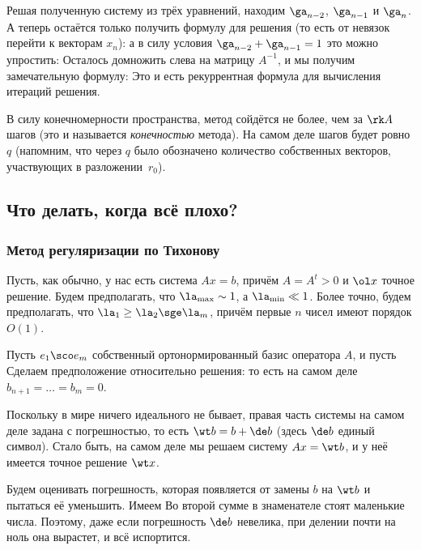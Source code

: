 \documentclass[a4paper]{article}
\begin{document}
Решая полученную систему из трёх уравнений, находим $\ga_{n-2}$,
$\ga_{n-1}$ и $\ga_n$.  А теперь остаётся только получить формулу для
решения (то есть от невязок перейти к векторам $x_n$):  а в силу условия $\ga_{n-2} + \ga_{n-1} = 1$ это
можно упростить:   Осталось домножить слева на
матрицу $A^{-1}$, и мы получим замечательную формулу:   Это
и есть рекуррентная формула для вычисления итераций решения.

В силу конечномерности пространства, метод сойдётся не более, чем за
$\rk A$ шагов (это и называется \emph{конечностью} метода).  На самом
деле шагов будет ровно $q$ (напомним, что через $q$ было обозначено
количество собственных векторов, участвующих в разложении~$r_0$).

\subsection{Что делать, когда всё плохо?}

\subsubsection{Метод регуляризации по Тихонову}

Пусть, как обычно, у нас есть система $Ax = b$, причём $A = A^t > 0$ и
$\ol x$ точное решение.  Будем предполагать, что $\la_{\max} \sim 1$,
а $\la_{\min} \ll 1$. Более точно, будем предполагать, что $\la_1 \ge
\la_2 \sge \la_m$, причём первые $n$ чисел имеют порядок $O(1)$.

Пусть $e_1\sco e_m$ собственный ортонормированный базис оператора $A$,
и пусть   Сделаем предположение
относительно решения:  то есть на самом деле $b_{n+1} = \dots = b_m = 0$.

Поскольку в мире ничего идеального не бывает, правая часть системы на
самом деле задана с погрешностью, то есть $\wt b = b + \de b$ (здесь
$\de b$ единый символ). Стало быть, на самом деле мы решаем систему
$Ax = \wt b$, и у неё имеется точное решение $\wt x$.

Будем оценивать погрешность, которая появляется от замены $b$ на $\wt
b$ и пытаться её уменьшить.  Имеем   Во второй сумме в знаменателе стоят маленькие
числа. Поэтому, даже если погрешность $\de b$ невелика, при делении
почти на ноль она вырастет, и всё испортится.
\end{document}
